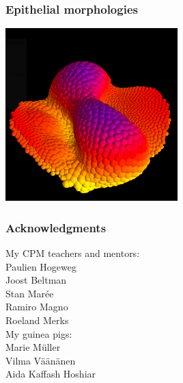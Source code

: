 \documentclass[compress]{beamer}
\begin{document}
\begin{frame}
\frametitle{Epithelial morphologies}
 \begin{center}
     \includegraphics[width=0.5\textwidth]{figures/embryomaker_phen.png}
     \end{center}
\end{frame}


\begin{frame}
 \frametitle{Acknowledgments}
 
 My CPM teachers and mentors:\\
 Paulien Hogeweg\\
 Joost Beltman\\
 Stan Mar\'ee\\
 Ramiro Magno\\
 Roeland Merks\\
 \vspace*{1cm}
 My guinea pigs:\\
 Marie M\"uller\\
 Vilma Väänänen\\
 Aida Kaffash Hoshiar\\
 
\end{frame}
\end{document}
